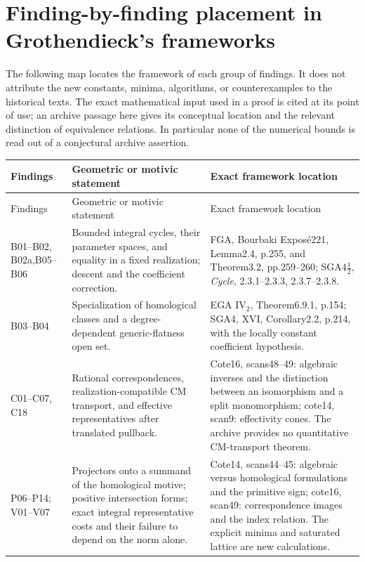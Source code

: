 \section{Finding-by-finding placement in Grothendieck's frameworks}
\label{sec:framework-map}

The following map locates the framework of each group of findings. It
does not attribute the new constants, minima, algorithms, or counterexamples
to the historical texts. The exact mathematical input used in a proof is
cited at its point of use; an archive passage here gives its conceptual
location and the relevant distinction of equivalence relations. In
particular none of the numerical bounds is read out of a conjectural
archive assertion.

\small
\begin{longtable}{@{}p{}p{}p{}@{}}
\toprule
Findings & Geometric or motivic statement & Exact framework location\\
\midrule
\endfirsthead
\toprule
Findings & Geometric or motivic statement & Exact framework location\\
\midrule
\endhead
B01--B02, B02a,\newline B05--B06 & Bounded integral cycles, their parameter spaces, and equality in a fixed realization; descent and the coefficient correction. & FGA, Bourbaki Expos\'e221, Lemma2.4, p.255, and Theorem3.2, pp.259--260; SGA$4\frac12$, \emph{Cycle}, 2.3.1--2.3.3, 2.3.7--2.3.8.\\[4pt]
B03--B04 & Specialization of homological classes and a degree-dependent generic-flatness open set. & EGA IV$_2$, Theorem6.9.1, p.154; SGA4, XVI, Corollary2.2, p.214, with the locally constant coefficient hypothesis.\\[4pt]
C01--C07, C18 & Rational correspondences, realization-compatible CM transport, and effective representatives after translated pullback. & Cote16, scans48--49: algebraic inverses and the distinction between an isomorphism and a split monomorphism; cote14, scan9: effectivity cones. The archive provides no quantitative CM-transport theorem.\\[4pt]
P06--P14; V01--V07 & Projectors onto a summand of the homological motive; positive intersection forms; exact integral representative costs and their failure to depend on the norm alone. & Cote14, scans44--45: algebraic versus homological formulations and the primitive sign; cote16, scan49: correspondence images and the index relation. The explicit minima and saturated lattice are new calculations.\\[4pt]

\end{longtable}
